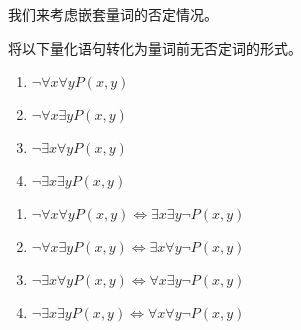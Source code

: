 我们来考虑嵌套量词的否定情况。
\begin{collections}
    \begin{example}
        将以下量化语句转化为量词前无否定词的形式。
        \begin{enumerate}
            \item $\lnot \forall x \forall y P(x,y)$
            \item $\lnot \forall x \exists y P(x,y)$
            \item $\lnot \exists x \forall y P(x,y)$
            \item $\lnot \exists x \exists y P(x,y)$
        \end{enumerate}
    \end{example}

    \begin{solution}
        \begin{enumerate}
            \item $\lnot \forall x \forall y P(x,y) \iff \exists x \exists y \lnot P(x,y)$
            \item $\lnot \forall x \exists y P(x,y) \iff \exists x \forall y \lnot P(x,y)$
            \item $\lnot \exists x \forall y P(x,y) \iff \forall x \exists y \lnot P(x,y)$
            \item $\lnot \exists x \exists y P(x,y) \iff \forall x \forall y \lnot P(x,y)$
        \end{enumerate}
    \end{solution}
\end{collections}